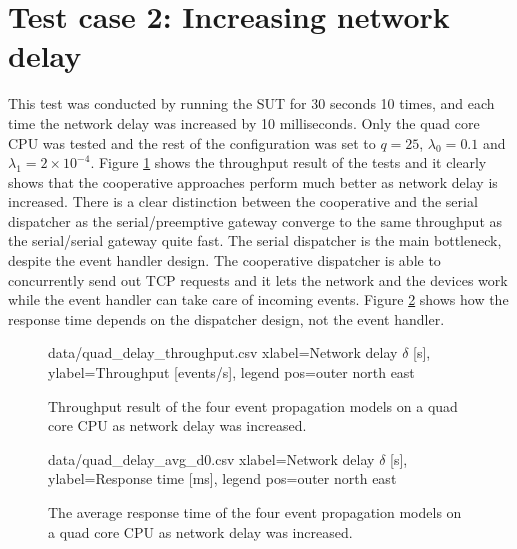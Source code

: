 \section{Test case 2: Increasing network delay}

This test was conducted by running the SUT for 30 seconds 10 times, and each
time the network delay was increased by 10 milliseconds. Only the quad core CPU
was tested and the rest of the configuration was set to $q = 25$, $\lambda_0 =
0.1$ and $\lambda_1 = 2 \times 10^{-4}$. Figure \ref{fig:quad_delay_throughput}
shows the throughput result of the tests and it clearly shows that the
cooperative approaches perform much better as network delay is increased.
There is a clear distinction between the cooperative and the serial dispatcher
as the serial/preemptive gateway converge to the same throughput as the
serial/serial gateway quite fast. The serial dispatcher is the main bottleneck,
despite the event handler design. The cooperative dispatcher is able to
concurrently send out TCP requests and it lets the network and the devices work
while the event handler can take care of incoming events. Figure
\ref{fig:quad_delay_avg_d0} shows how the response time depends on the
dispatcher design, not the event handler.

\begin{figure}[h!]
    \centering
    \performanceplot
    {data/quad_delay_throughput.csv}
    {
        xlabel={Network delay $\delta$ [s]},
        ylabel={Throughput [events/s]},
        legend pos=outer north east
    }

    \caption[Throughput result when network delay was increased.]{Throughput
    result of the four event propagation models on a quad core CPU as network
    delay was increased.}

    \label{fig:quad_delay_throughput}
\end{figure}

\begin{figure}[h!]
    \centering
    \performanceplot
    {data/quad_delay_avg_d0.csv}
    {
        xlabel={Network delay $\delta$ [s]},
        ylabel={Response time [ms]},
        legend pos=outer north east
    }

    \caption[Response time when network delay was increased.]{The average
    response time of the four event propagation models on a quad core CPU as
    network delay was increased.}

    \label{fig:quad_delay_avg_d0}
\end{figure}

